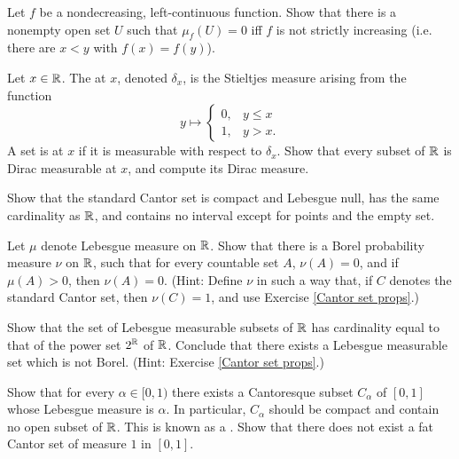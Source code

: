 \begin{exercise}
Let $f$ be a nondecreasing, left-continuous function. Show that there is a nonempty open set $U$ such that $\mu_f(U) = 0$ iff $f$ is not strictly increasing (i.e. there are $x < y$ with $f(x) = f(y)$).
\end{exercise}

\begin{exercise}
\label{Dirac measure}
Let $x \in \mathbb{R}$. The  at $x$, denoted $\delta_x$, is the Stieltjes measure arising from the function
$$y \mapsto \begin{cases}
0, &y \leq x\\
1, &y > x.
\end{cases}$$
A set is  at $x$ if it is measurable with respect to $\delta_x$.
Show that every subset of $\mathbb{R}$ is Dirac measurable at $x$, and compute its Dirac measure.
\end{exercise}

\begin{exercise}
\label{Cantor set props}
Show that the standard Cantor set is compact and Lebesgue null, has the same cardinality as $\mathbb{R}$, and contains no interval except for points and the empty set.
\end{exercise}

\begin{exercise}
Let $\mu$ denote Lebesgue measure on $\mathbb{R}$.
Show that there is a Borel probability measure $\nu$ on $\mathbb{R}$, such that for every countable set $A$, $\nu(A) = 0$, and if $\mu(A) > 0$, then $\nu(A) = 0$.
(Hint: Define $\nu$ in such a way that, if $C$ denotes the standard Cantor set, then $\nu(C) = 1$, and use Exercise \ref{Cantor set props}.)
\end{exercise}

\begin{exercise}
Show that the set of Lebesgue measurable subsets of $\mathbb{R}$ has cardinality equal to that of the power set $2^{\mathbb{R}}$ of $\mathbb{R}$. Conclude that there exists a Lebesgue measurable set which is not Borel.
(Hint: Exercise \ref{Cantor set props}.)
\end{exercise}

\begin{exercise}
\label{fat cat}
Show that for every $\alpha \in [0, 1)$ there exists a Cantoresque subset $C_\alpha$ of $[0, 1]$ whose Lebesgue measure is $\alpha$.
In particular, $C_\alpha$ should be compact and contain no open subset of $\mathbb{R}$.
This is known as a .
Show that there does not exist a fat Cantor set of measure $1$ in $[0, 1]$.
\end{exercise}

